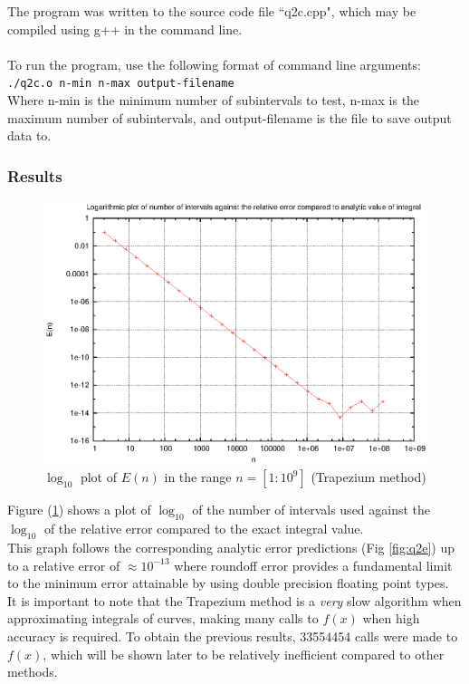 \documentclass[pdf,color]{UoBnote}
\begin{document}
				The program was written to the source code file ``q2c.cpp", which may be compiled using g++ in the command line.\\\\
				To run the program, use the following format of command line arguments:\\
				\texttt{./q2c.o n-min n-max output-filename}\\
				
				Where n-min is the minimum number of subintervals to test, n-max is the maximum number of subintervals, and output-filename is the file to save output data to.
				\subsubsection{Results}
				
				\begin{figure}[H]
					\centering
						\includegraphics{figures/q2d_labelled.eps}
					\caption{$\log_{10}$ plot of $E(n)$ in the range $n = [1:10^{9}]$ (Trapezium method)}
					\label{fig:q2d}
				\end{figure}
				
				Figure (\ref{fig:q2d}) shows a plot of $\log_{10}$ of the number of intervals used against the $\log_{10}$ of the relative error compared to the exact integral value.\\
				This graph follows the corresponding analytic error predictions (Fig \ref{fig:q2e}) up to a relative error of $\approx 10^{-13}$ where roundoff error provides a fundamental limit to the minimum error attainable by using double precision floating point types.\\
				It is important to note that the Trapezium method is a \emph{very} slow algorithm when approximating integrals of curves, making many calls to $f(x)$ when high accuracy is required. To obtain the previous results, 33554454 calls were made to $f(x)$, which will be shown later to be relatively inefficient compared to other methods.
	
\end{document}
